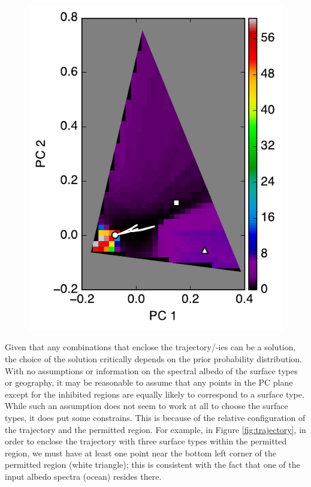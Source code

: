 \documentclass[iop,numberedappendix,apj,]{emulateapj}
\begin{document}
\begin{figure}[tbh!]
\begin{minipage}{0.33\hsize}
\begin{center}
\includegraphics[width=\hsize]{mockdata_90deg_3types2_t360_lc_noreg.pdf}
    \end{center}
     \end{minipage} 
    \caption{}%
\label{fig:noreg}
\end{figure}


Given that any combinations that enclose the trajectory/-ies can be a solution, the choice of the solution critically depends on the prior probability distribution. 
With no assumptions or information on the spectral albedo of the surface types or geography, it may be reasonable to assume that any points in the PC plane except for the inhibited regions are equally likely to correspond to a surface type. 
While such an assumption does not seem to work at all to choose the surface types, it does put some constrains. 
This is because of the relative configuration of the trajectory and the permitted region. 
For example, in Figure \ref{fig:trajectory}, in order to enclose the trajectory with three surface types within the permitted region, we must have at least one point near the bottom left corner of the permitted region (white triangle); this is consistent with the fact that one of the input albedo spectra (ocean) resides there. 
\end{document}
